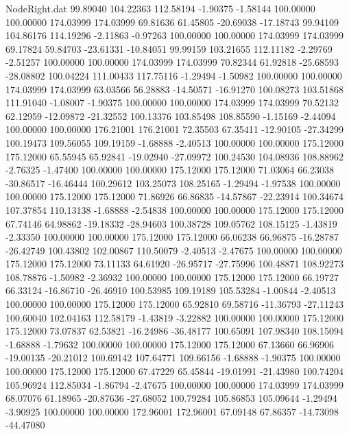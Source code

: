 \begin{filecontents}{NodeRight.dat}
  99.89040  104.22363  112.58194    -1.90375   -1.58144  100.00000  100.00000  174.03999  174.03999   69.81636   61.45805  -20.69038  -17.18743
  99.94109  104.86176  114.19296    -2.11863   -0.97263  100.00000  100.00000  174.03999  174.03999   69.17824   59.84703  -23.61331  -10.84051
  99.99159  103.21655  112.11182    -2.29769   -2.51257  100.00000  100.00000  174.03999  174.03999   70.82344   61.92818  -25.68593  -28.08802
 100.04224  111.00433  117.75116    -1.29494   -1.50982  100.00000  100.00000  174.03999  174.03999   63.03566   56.28883  -14.50571  -16.91270
 100.08273  103.51868  111.91040    -1.08007   -1.90375  100.00000  100.00000  174.03999  174.03999   70.52132   62.12959  -12.09872  -21.32552
 100.13376  103.85498  108.85590    -1.15169   -2.44094  100.00000  100.00000  176.21001  176.21001   72.35503   67.35411  -12.90105  -27.34299
 100.19473  109.56055  109.19159    -1.68888   -2.40513  100.00000  100.00000  175.12000  175.12000   65.55945   65.92841  -19.02940  -27.09972
 100.24530  104.08936  108.88962    -2.76325   -1.47400  100.00000  100.00000  175.12000  175.12000   71.03064   66.23038  -30.86517  -16.46444
 100.29612  103.25073  108.25165    -1.29494   -1.97538  100.00000  100.00000  175.12000  175.12000   71.86926   66.86835  -14.57867  -22.23914
 100.34674  107.37854  110.13138    -1.68888   -2.54838  100.00000  100.00000  175.12000  175.12000   67.74146   64.98862  -19.18332  -28.94603
 100.38728  109.05762  108.15125    -1.43819   -2.33350  100.00000  100.00000  175.12000  175.12000   66.06238   66.96875  -16.28787  -26.42749
 100.43802  102.00867  110.50079    -2.40513   -2.47675  100.00000  100.00000  175.12000  175.12000   73.11133   64.61920  -26.95717  -27.75996
 100.48871  108.92273  108.78876    -1.50982   -2.36932  100.00000  100.00000  175.12000  175.12000   66.19727   66.33124  -16.86710  -26.46910
 100.53985  109.19189  105.53284    -1.00844   -2.40513  100.00000  100.00000  175.12000  175.12000   65.92810   69.58716  -11.36793  -27.11243
 100.60040  102.04163  112.58179    -1.43819   -3.22882  100.00000  100.00000  175.12000  175.12000   73.07837   62.53821  -16.24986  -36.48177
 100.65091  107.98340  108.15094    -1.68888   -1.79632  100.00000  100.00000  175.12000  175.12000   67.13660   66.96906  -19.00135  -20.21012
 100.69142  107.64771  109.66156    -1.68888   -1.90375  100.00000  100.00000  175.12000  175.12000   67.47229   65.45844  -19.01991  -21.43980
 100.74204  105.96924  112.85034    -1.86794   -2.47675  100.00000  100.00000  174.03999  174.03999   68.07076   61.18965  -20.87636  -27.68052
 100.79284  105.86853  105.09644    -1.29494   -3.90925  100.00000  100.00000  172.96001  172.96001   67.09148   67.86357  -14.73098  -44.47080

\end{filecontents}
